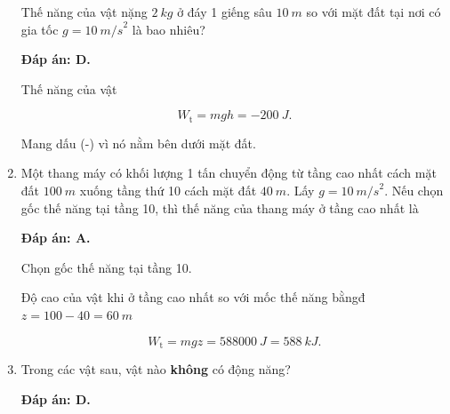 \begin{enumerate}[label=\bfseries Câu \arabic*:]
	
	{Thế năng của vật nặng $\SI{2}{kg}$ ở đáy 1 giếng sâu $\SI{10}{m}$ so với mặt đất tại nơi có gia tốc $g = \SI{10}{m/s}^2$ là bao nhiêu?
	}
	
	\hideall
	{	
		\textbf{Đáp án: D.}
		
		Thế năng của vật
		
		$$W_\text{t} = mgh = -\SI{200}{J}.$$
		
		Mang dấu (-)  vì nó nằm bên dưới mặt đất.
	}
		\item {}
	
	
	{Một thang máy có khối lượng 1 tấn chuyển động từ tầng cao nhất cách mặt đất $\SI{100}{m}$ xuống tầng thứ 10 cách mặt đất $\SI{40}{m}$. Lấy $g = \SI{10}{m/s}^2$. Nếu chọn gốc thế năng tại tầng 10, thì thế năng của thang máy ở tầng cao nhất là
	}
	
	\hideall
	{	
		\textbf{Đáp án: A.}
		
		Chọn gốc thế năng tại tầng 10.
		
		Độ cao của vật khi ở tầng cao nhất so với mốc thế năng bằngđ $z = 100 - 40 = \SI{60}{m}$ 
		
		$$W_\text{t} = mgz = \SI{588000}{J} = \SI{588}{kJ}.$$
	}
		\item {}
	
	
	{Trong các vật sau, vật nào \textbf{không} có động năng?
	}
	
	\hideall
	{	
		\textbf{Đáp án: D.}
		
}
\end{enumerate}
